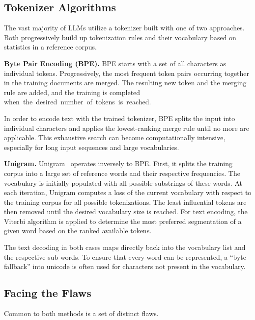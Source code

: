 \documentclass[11pt]{article}
\begin{document}
\subsection{Tokenizer Algorithms}

The vast majority of LLMs utilize a tokenizer built with one of two approaches. Both progressively build up tokenization rules and their vocabulary based on statistics in a reference corpus.

\textbf{Byte Pair Encoding (BPE).}
BPE \cite{sennrich2016bpe} starts with a set of all characters as individual tokens. Progressively, the most frequent token pairs occurring together in the training documents are merged.
The resulting new token and the merging rule are added, and the training is completed \mbox{when the desired number of tokens is reached.}

In order to encode text with the trained tokenizer, BPE splits the input into individual characters and applies the lowest-ranking merge rule until no more are applicable. This exhaustive search can become computationally intensive, especially for long input sequences and large vocabularies. 

\textbf{Unigram.}
Unigram~\cite{kudo2018sentencepiece} operates inversely to BPE. 
First, it splits the training corpus into a large set of reference words and their respective frequencies. The vocabulary is initially populated with all possible substrings of these words.
At each iteration, Unigram computes a loss of the current vocabulary with respect to the training corpus for all possible tokenizations. The least influential tokens are then removed until the desired vocabulary size is reached. 
For text encoding, the Viterbi algorithm is applied to determine the most preferred segmentation of a given word based on the ranked available tokens.

The text decoding in both cases maps directly back into the vocabulary list and the respective sub-words. 
To ensure that every word can be represented, a ``byte-fallback'' into unicode is often used for characters not present in the vocabulary.

\subsection{Facing the Flaws} \label{sec:flaws}

Common to both methods is a set of distinct flaws.
\end{document}
